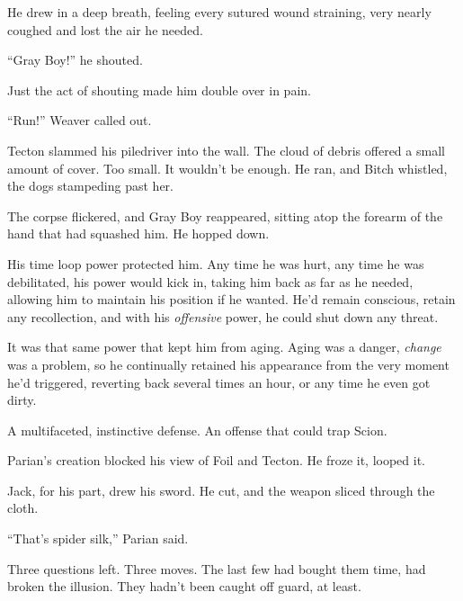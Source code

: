 He drew in a deep breath, feeling every sutured wound straining, very nearly coughed and lost the air he needed.



``Gray Boy!'' he shouted.



Just the act of shouting made him double over in pain.



``Run!'' Weaver called out.



Tecton slammed his piledriver into the wall.  The cloud of debris offered a small amount of cover.  Too small.  It wouldn't be enough.  He ran, and Bitch whistled, the dogs stampeding past her.



The corpse flickered, and Gray Boy reappeared, sitting atop the forearm of the hand that had squashed him.  He hopped down.



His time loop power protected him.  Any time he was hurt, any time he was debilitated, his power would kick in, taking him back as far as he needed, allowing him to maintain his position if he wanted.  He'd remain conscious, retain any recollection, and with his \emph{offensive} power, he could shut down any threat.



It was that same power that kept him from aging.  Aging was a danger, \emph{change} was a problem, so he continually retained his appearance from the very moment he'd triggered, reverting back several times an hour, or any time he even got dirty.



A multifaceted, instinctive defense.  An offense that could trap Scion.



Parian's creation blocked his view of Foil and Tecton.  He froze it, looped it.



Jack, for his part, drew his sword.  He cut, and the weapon sliced through the cloth.



``That's spider silk,'' Parian said.



Three questions left.  Three moves.  The last few had bought them time, had broken the illusion.  They hadn't been caught off guard, at least.



